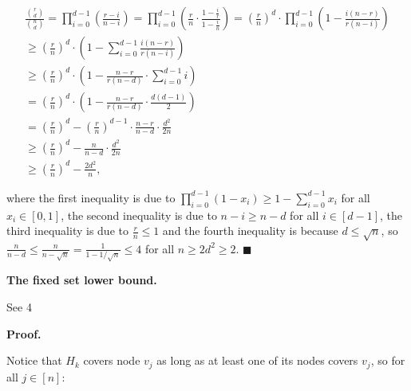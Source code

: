 \documentclass[10pt,a4paper]{article}
\begin{document}
\[\begin{gathered}
\displaystyle\frac{\binom{r}{d}}{\binom{n}{d}}=\prod_{i=0}^{d-1}\left(\frac{r-i}{n-i}\right)=\prod_{i=0}^{d-1}\left(\frac{r}{n}\cdot\frac{1-\frac{i}{r}}{1-\frac{i}{n}}\right) \displaystyle=\left(\frac{r}{n}\right)^{d}\cdot\prod_{i=0}^{d-1}\left(1-\frac{i(n-r)}{r(n-i)}\right) \\
\displaystyle\geq\left(\frac{r}{n}\right)^{d}\cdot\left(1-\sum_{i=0}^{d-1}\frac{i(n-r)}{r(n-i)}\right) \\
\displaystyle\geq\left(\frac{r}{n}\right)^{d}\cdot\left(1-\frac{n-r}{r(n-d)}\cdot\sum_{i=0}^{d-1}i\right) \\
\displaystyle=\left(\frac{r}{n}\right)^{d}\cdot\left(1-\frac{n-r}{r(n-d)}\cdot\frac{d(d-1)}{2}\right) \\
\displaystyle=\left(\frac{r}{n}\right)^{d}-\left(\frac{r}{n}\right)^{d-1}\cdot\frac{n-r}{n-d}\cdot\frac{d^{2}}{2n} \\
\displaystyle\geq\left(\frac{r}{n}\right)^{d}-\frac{n}{n-d}\cdot\frac{d^{2}}{2n} \\
\displaystyle\geq\left(\frac{r}{n}\right)^{d}-\frac{2d^{2}}{n},
\end{gathered}\]


where the first inequality is due to $\prod_{i=0}^{d-1}(1-x_{i})\geq 1-\sum_{i=0}^{d-1}x_{i}$ for all $x_{i}\in[0,1]$, the second inequality is due to $n-i\geq n-d$ for all $i\in[d-1]$, the third inequality is due to $\frac{r}{n}\leq 1$ and the fourth inequality is because $d\leq\sqrt{n}$, so $\frac{n}{n-d}\leq\frac{n}{n-\sqrt{n}}=\frac{1}{1-1/\sqrt{n}}\leq 4$ for all $n\geq 2d^{2}\geq 2$.
\ensuremath{\blacksquare}\par






\par\medskip\noindent\textbf{The fixed set lower bound.}\par




See 4\par




\par\medskip\noindent\textbf{Proof.}\par



Notice that $H_{k}$ covers node $v_{j}$ as long as at least one of its nodes covers $v_{j}$, so for all $j\in[n]$:\par
\end{document}
